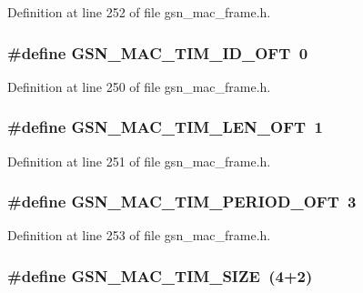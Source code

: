 Definition at line 252 of file gsn\_\-mac\_\-frame.h.

\hypertarget{a00523_a98a986eff384d4fbed7a37104023c47f}{
\subsubsection[{GSN\_\-MAC\_\-TIM\_\-ID\_\-OFT}]{\setlength{\rightskip}{0pt plus 5cm}\#define GSN\_\-MAC\_\-TIM\_\-ID\_\-OFT~0}}
\label{a00523_a98a986eff384d4fbed7a37104023c47f}


Definition at line 250 of file gsn\_\-mac\_\-frame.h.

\hypertarget{a00523_a12a7796e5fd63c3fb196b85dc897671d}{
\subsubsection[{GSN\_\-MAC\_\-TIM\_\-LEN\_\-OFT}]{\setlength{\rightskip}{0pt plus 5cm}\#define GSN\_\-MAC\_\-TIM\_\-LEN\_\-OFT~1}}
\label{a00523_a12a7796e5fd63c3fb196b85dc897671d}


Definition at line 251 of file gsn\_\-mac\_\-frame.h.

\hypertarget{a00523_a702536e391aefc8f26055b1d47c6fcb3}{
\subsubsection[{GSN\_\-MAC\_\-TIM\_\-PERIOD\_\-OFT}]{\setlength{\rightskip}{0pt plus 5cm}\#define GSN\_\-MAC\_\-TIM\_\-PERIOD\_\-OFT~3}}
\label{a00523_a702536e391aefc8f26055b1d47c6fcb3}


Definition at line 253 of file gsn\_\-mac\_\-frame.h.

\hypertarget{a00523_af8ef931a53f85ec730dfc8611efe55f7}{
\subsubsection[{GSN\_\-MAC\_\-TIM\_\-SIZE}]{\setlength{\rightskip}{0pt plus 5cm}\#define GSN\_\-MAC\_\-TIM\_\-SIZE~(4+2)}}
\label{a00523_af8ef931a53f85ec730dfc8611efe55f7}


